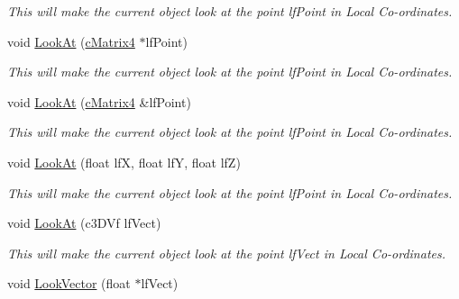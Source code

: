 \begin{DoxyCompactItemize}
\begin{DoxyCompactList}\small\item\em This will make the current object look at the point lfPoint in Local Co-\/ordinates. \end{DoxyCompactList}\item 
\hypertarget{classc_matrix4_ade806c1acf4d2b367b5cf3179a93c733}{
void \hyperlink{classc_matrix4_ade806c1acf4d2b367b5cf3179a93c733}{LookAt} (\hyperlink{classc_matrix4}{cMatrix4} $\ast$lfPoint)}
\label{classc_matrix4_ade806c1acf4d2b367b5cf3179a93c733}

\begin{DoxyCompactList}\small\item\em This will make the current object look at the point lfPoint in Local Co-\/ordinates. \end{DoxyCompactList}\item 
\hypertarget{classc_matrix4_ad11efc9975ea8db0d7c728a2c215b532}{
void \hyperlink{classc_matrix4_ad11efc9975ea8db0d7c728a2c215b532}{LookAt} (\hyperlink{classc_matrix4}{cMatrix4} \&lfPoint)}
\label{classc_matrix4_ad11efc9975ea8db0d7c728a2c215b532}

\begin{DoxyCompactList}\small\item\em This will make the current object look at the point lfPoint in Local Co-\/ordinates. \end{DoxyCompactList}\item 
\hypertarget{classc_matrix4_ad6d00603264b64af06f98208978908c9}{
void \hyperlink{classc_matrix4_ad6d00603264b64af06f98208978908c9}{LookAt} (float lfX, float lfY, float lfZ)}
\label{classc_matrix4_ad6d00603264b64af06f98208978908c9}

\begin{DoxyCompactList}\small\item\em This will make the current object look at the point lfPoint in Local Co-\/ordinates. \end{DoxyCompactList}\item 
\hypertarget{classc_matrix4_ab085c6a0964db502efd867ff1b89d567}{
void \hyperlink{classc_matrix4_ab085c6a0964db502efd867ff1b89d567}{LookAt} (c3DVf lfVect)}
\label{classc_matrix4_ab085c6a0964db502efd867ff1b89d567}

\begin{DoxyCompactList}\small\item\em This will make the current object look at the point lfVect in Local Co-\/ordinates. \end{DoxyCompactList}\item 
\hypertarget{classc_matrix4_a3bf4d3fd5053e524f48d2ef03c7ab187}{
void \hyperlink{classc_matrix4_a3bf4d3fd5053e524f48d2ef03c7ab187}{LookVector} (float $\ast$lfVect)}
\label{classc_matrix4_a3bf4d3fd5053e524f48d2ef03c7ab187}


\end{DoxyCompactItemize}
